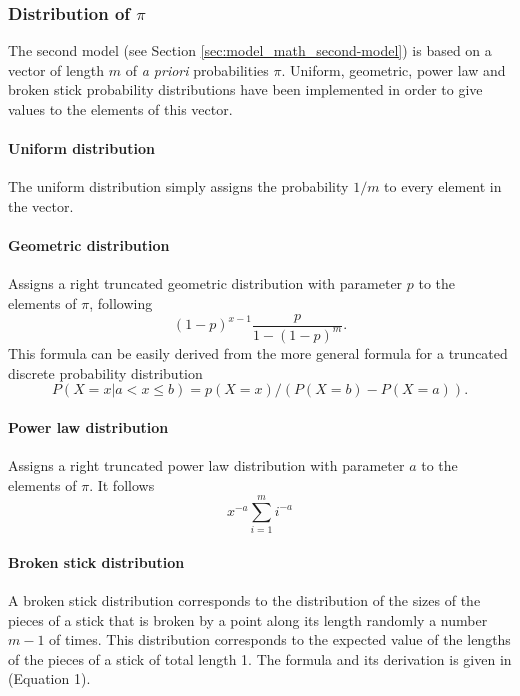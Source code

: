 \subsubsection{Distribution of $\pi$}

The second model (see Section \ref{sec:model_math_second-model}) is based on a vector of length $m$ of \emph{a priori} probabilities $\pi$.
Uniform, geometric, power law and broken stick probability distributions have been implemented in order to give values to the elements of this vector.

\paragraph{Uniform distribution} The uniform distribution simply assigns the probability $1/m$ to every element in the vector.

\paragraph{Geometric distribution} Assigns a right truncated geometric distribution with parameter $p$ to the elements of $\pi$, following
\begin{equation*}
  (1-p)^{x-1} \frac{p}{1 - (1-p)^m}.
\end{equation*}
This formula can be easily derived from the more general formula for a truncated discrete probability distribution
\begin{equation*}
  P(X=x | a < x \leq b) = p(X=x) / (P(X=b) - P(X=a)).
\end{equation*}

\paragraph{Power law distribution} Assigns a right truncated power law distribution with parameter $a$ to the elements of $\pi$.
It follows
\begin{equation*}
  x^{-a} \sum_{i=1}^m i^{-a}
\end{equation*}

\paragraph{Broken stick distribution} A broken stick distribution corresponds to the distribution of the sizes of the pieces of a stick that is broken by a point along its length randomly a number $m-1$ of times.
This distribution corresponds to the expected value of the lengths of the pieces of a stick of total length 1.
The formula and its derivation is given in \cite{Smart1976a} (Equation 1).


